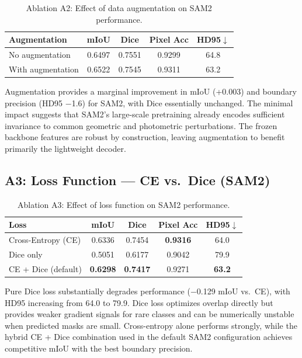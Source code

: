 \documentclass[11pt]{article}
\begin{document}
\begin{table}[H]
\centering
\caption{Ablation A2: Effect of data augmentation on SAM2 performance.}
\label{tab:abl_aug}
\begin{tabular}{lcccc}
\toprule
Augmentation & mIoU & Dice & Pixel Acc & HD95$\downarrow$ \\
\midrule
No augmentation & 0.6497 & 0.7551 & 0.9299 & 64.8 \\
With augmentation & 0.6522 & 0.7545 & 0.9311 & 63.2 \\
\bottomrule
\end{tabular}
\end{table}

Augmentation provides a marginal improvement in mIoU (+0.003) and boundary precision (HD95 $-$1.6) for SAM2, with Dice essentially unchanged. The minimal impact suggests that SAM2's large-scale pretraining already encodes sufficient invariance to common geometric and photometric perturbations. The frozen backbone features are robust by construction, leaving augmentation to benefit primarily the lightweight decoder.

\subsection{A3: Loss Function --- CE vs.\ Dice (SAM2)}

\begin{table}[H]
\centering
\caption{Ablation A3: Effect of loss function on SAM2 performance.}
\label{tab:abl_loss}
\begin{tabular}{lcccc}
\toprule
Loss & mIoU & Dice & Pixel Acc & HD95$\downarrow$ \\
\midrule
Cross-Entropy (CE) & 0.6336 & 0.7454 & \textbf{0.9316} & 64.0 \\
Dice only & 0.5051 & 0.6177 & 0.9042 & 79.9 \\
CE + Dice (default) & \textbf{0.6298} & \textbf{0.7417} & 0.9271 & \textbf{63.2} \\
\bottomrule
\end{tabular}
\end{table}

Pure Dice loss substantially degrades performance ($-$0.129 mIoU vs.\ CE), with HD95 increasing from 64.0 to 79.9. Dice loss optimizes overlap directly but provides weaker gradient signals for rare classes and can be numerically unstable when predicted masks are small. Cross-entropy alone performs strongly, while the hybrid CE + Dice combination used in the default SAM2 configuration achieves competitive mIoU with the best boundary precision.
\end{document}
